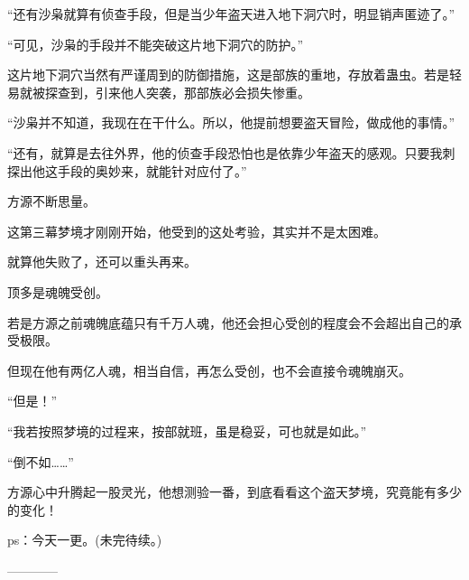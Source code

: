 \begin{this_body}
“还有沙枭就算有侦查手段，但是当少年盗天进入地下洞穴时，明显销声匿迹了。”

“可见，沙枭的手段并不能突破这片地下洞穴的防护。”

这片地下洞穴当然有严谨周到的防御措施，这是部族的重地，存放着蛊虫。若是轻易就被探查到，引来他人突袭，那部族必会损失惨重。

“沙枭并不知道，我现在在干什么。所以，他提前想要盗天冒险，做成他的事情。”

“还有，就算是去往外界，他的侦查手段恐怕也是依靠少年盗天的感观。只要我刺探出他这手段的奥妙来，就能针对应付了。”

方源不断思量。

这第三幕梦境才刚刚开始，他受到的这处考验，其实并不是太困难。

就算他失败了，还可以重头再来。

顶多是魂魄受创。

若是方源之前魂魄底蕴只有千万人魂，他还会担心受创的程度会不会超出自己的承受极限。

但现在他有两亿人魂，相当自信，再怎么受创，也不会直接令魂魄崩灭。

“但是！”

“我若按照梦境的过程来，按部就班，虽是稳妥，可也就是如此。”

“倒不如……”

方源心中升腾起一股灵光，他想测验一番，到底看看这个盗天梦境，究竟能有多少的变化！

ps：今天一更。(未完待续。)

------------

\end{this_body}

